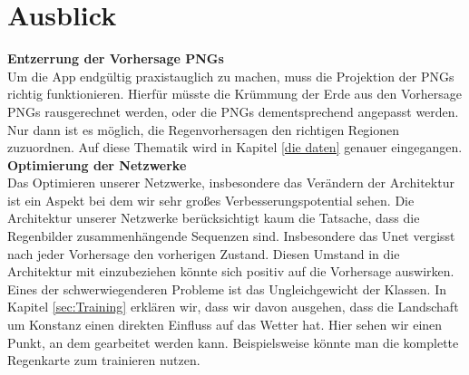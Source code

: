 \newpage
\section{Ausblick}
\textbf{Entzerrung der Vorhersage PNGs} \\

\noindent Um die App endgültig praxistauglich zu machen, muss die Projektion der PNGs richtig funktionieren. 
Hierfür müsste die Krümmung der Erde aus den Vorhersage PNGs rausgerechnet werden, oder die PNGs dementsprechend angepasst werden. 
Nur dann ist es möglich, die Regenvorhersagen den richtigen Regionen zuzuordnen. 
Auf diese Thematik wird in Kapitel \ref*{die daten} genauer eingegangen. \\

\noindent \textbf{Optimierung der Netzwerke} \\

\noindent Das Optimieren unserer Netzwerke, insbesondere das Verändern der Architektur ist ein Aspekt bei dem wir sehr großes Verbesserungspotential sehen.
Die Architektur unserer Netzwerke berücksichtigt kaum die Tatsache, dass die Regenbilder zusammenhängende Sequenzen sind.
Insbesondere das Unet vergisst nach jeder Vorhersage den vorherigen Zustand. Diesen Umstand in die Architektur mit einzubeziehen könnte sich positiv auf die Vorhersage auswirken.
Eines der schwerwiegenderen Probleme ist das Ungleichgewicht der Klassen. In Kapitel \ref{sec:Training} erklären wir, dass wir davon ausgehen, dass die Landschaft um Konstanz einen direkten Einfluss auf das Wetter hat. Hier sehen wir einen Punkt, an dem gearbeitet werden kann. Beispielsweise könnte man die komplette Regenkarte zum trainieren nutzen.


